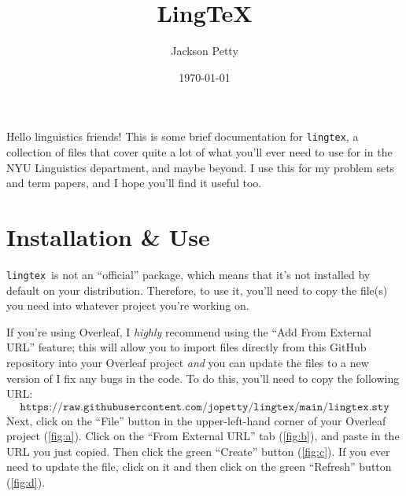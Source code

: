 \documentclass{article}
\title{Ling\TeX}
\author{Jackson Petty}
\date{\today}
\def\lingtex{\texttt{lingtex}}
\begin{document}
\maketitle

\noindent
Hello linguistics friends! This is some brief documentation for \texttt{lingtex}, a collection of  files that cover quite a lot of what you'll ever need to use  for in the NYU Linguistics department, and maybe beyond. I use this for my problem sets and term papers, and I hope you'll find it useful too.

\section{Installation \& Use} \label{sec:installation-use}

\lingtex\ is not an \enquote{official}  package, which means that it's not installed by default on your  distribution. Therefore, to use it, you'll need to copy the file(s) you need into whatever project you're working on.

If you're using Overleaf, I \emph{highly} recommend using the \enquote{Add From External URL} feature; this will allow you to import files directly from this GitHub repository into your Overleaf project \emph{and} you can update the files to a new version of I fix any bugs in the code. To do this, you'll need to copy the following URL:
$$
	\texttt{https://raw.githubusercontent.com/jopetty/lingtex/main/lingtex.sty}
$$
Next, click on the \enquote{File} button in the upper-left-hand corner of your Overleaf project (\ref{fig:a}). Click on the \enquote{From External URL} tab (\ref{fig:b}), and paste in the URL you just copied.  Then click the green \enquote{Create} button (\ref{fig:c}). If you ever need to update the file, click on it and then click on the green \enquote{Refresh} button (\ref{fig:d}).
\end{document}
